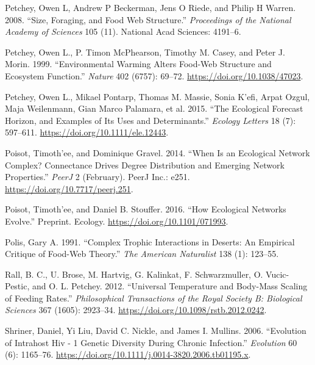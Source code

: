 \documentclass{article}
\begin{document}
\leavevmode\hypertarget{ref-petchey2008size}{}%
Petchey, Owen L, Andrew P Beckerman, Jens O Riede, and Philip H Warren.
2008. ``Size, Foraging, and Food Web Structure.'' \emph{Proceedings of
the National Academy of Sciences} 105 (11). National Acad Sciences:
4191--6.

\leavevmode\hypertarget{ref-petcheyEnvironmentalWarmingAlters1999}{}%
Petchey, Owen L., P. Timon McPhearson, Timothy M. Casey, and Peter J.
Morin. 1999. ``Environmental Warming Alters Food-Web Structure and
Ecosystem Function.'' \emph{Nature} 402 (6757): 69--72.
\url{https://doi.org/10.1038/47023}.

\leavevmode\hypertarget{ref-petcheyEcologicalForecastHorizon2015}{}%
Petchey, Owen L., Mikael Pontarp, Thomas M. Massie, Sonia K\a'efi, Arpat
Ozgul, Maja Weilenmann, Gian Marco Palamara, et al. 2015. ``The
Ecological Forecast Horizon, and Examples of Its Uses and
Determinants.'' \emph{Ecology Letters} 18 (7): 597--611.
\url{https://doi.org/10.1111/ele.12443}.

\leavevmode\hypertarget{ref-poisotWhenEcologicalNetwork2014}{}%
Poisot, Timoth\a'ee, and Dominique Gravel. 2014. ``When Is an Ecological
Network Complex? Connectance Drives Degree Distribution and Emerging
Network Properties.'' \emph{PeerJ} 2 (February). PeerJ Inc.: e251.
\url{https://doi.org/10.7717/peerj.251}.

\leavevmode\hypertarget{ref-poisotHowEcologicalNetworks2016}{}%
Poisot, Timoth\a'ee, and Daniel B. Stouffer. 2016. ``How Ecological
Networks Evolve.'' Preprint. Ecology.
\url{https://doi.org/10.1101/071993}.

\leavevmode\hypertarget{ref-polisComplexTrophicInteractions1991}{}%
Polis, Gary A. 1991. ``Complex Trophic Interactions in Deserts: An
Empirical Critique of Food-Web Theory.'' \emph{The American Naturalist}
138 (1): 123--55.

\leavevmode\hypertarget{ref-rallUniversalTemperatureBodymass2012}{}%
Rall, B. C., U. Brose, M. Hartvig, G. Kalinkat, F. Schwarzmuller, O.
Vucic-Pestic, and O. L. Petchey. 2012. ``Universal Temperature and
Body-Mass Scaling of Feeding Rates.'' \emph{Philosophical Transactions
of the Royal Society B: Biological Sciences} 367 (1605): 2923--34.
\url{https://doi.org/10.1098/rstb.2012.0242}.

\leavevmode\hypertarget{ref-shrinerEvolutionIntrahostHiv2006}{}%
Shriner, Daniel, Yi Liu, David C. Nickle, and James I. Mullins. 2006.
``Evolution of Intrahost Hiv - 1 Genetic Diversity During Chronic
Infection.'' \emph{Evolution} 60 (6): 1165--76.
\url{https://doi.org/10.1111/j.0014-3820.2006.tb01195.x}.
\end{document}

